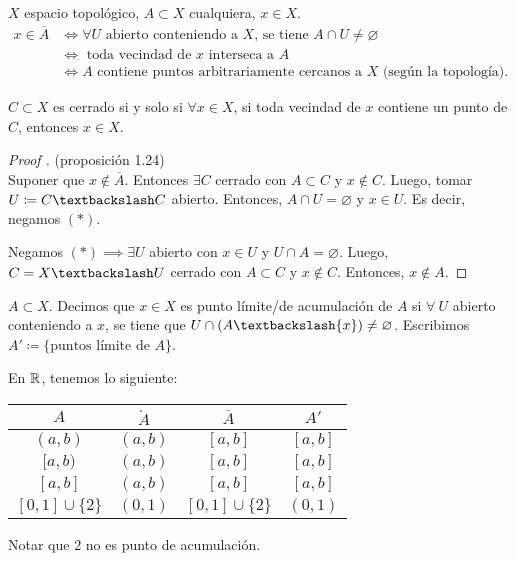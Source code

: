\begin{prop}
	$X$ espacio topológico, $A \subset X$ cualquiera, $x \in X$.
	\begin{align*}
		x \in \overline{A} & \iff \forall U \text{ abierto conteniendo a } X \text{, se tiene } A \cap U \neq \varnothing \tag*{($*$)} \\
		& \iff \text{ toda vecindad de } x \text{ interseca a } A \\
		& \iff A \text{ contiene puntos arbitrariamente cercanos a } X \text{ (según la topología)}
	.\end{align*}
\end{prop}

\begin{corollary}
	$C \subset X$ es cerrado si y solo si $\forall x \in X$, si toda vecindad de $x$ contiene un punto de $C$, entonces $x \in X$.
\end{corollary}

\begin{proof}[Proof ] (proposición 1.24) \\
	\Ifstep Suponer que $x \not\in \overline{A}$. Entonces $\exists C$ cerrado con $A \subset C$ y $x \not\in C$. Luego, tomar $U \coloneq C \textbackslash C$ abierto. Entonces, $A \cap U = \varnothing$ y $x \in U$. Es decir, negamos $(*)$.

	\noindent \Onlyifstep Negamos $(*) \implies \exists U$ abierto con $x \in U$ y $U \cap A = \varnothing$. Luego, $C = X \textbackslash U$ cerrado con $A \subset C$ y $x \not\in C$. Entonces, $x \not\in A$.
\end{proof}

\begin{definition}
	$A \subset X$. Decimos que $x \in X$ es punto límite/de acumulación de $A$ si $\forall \ U$ abierto conteniendo a $x$, se tiene que $U \cap ( A \textbackslash \{ x \} ) \neq \varnothing$. Escribimos $A' \coloneq \{ \text{puntos límite de } A \}$.
\end{definition}

\begin{eg}
	En $\mathbb{R}$, tenemos lo siguiente:
	\begin{center}
	\begin{tabular}{ | c | c | c | c | }
		\hline
		$A$ & $\mathring{A}$ & $\overline{A}$ & $A'$ \\
		\hline
		$(a,b)$ & $(a,b)$ & $[a,b]$ & $[a,b]$ \\
		$[a,b)$ & $(a,b)$ & $[a,b]$ & $[a,b]$ \\
		$[a,b]$ & $(a,b)$ & $[a,b]$ & $[a,b]$ \\
		$[0,1] \cup \{2\}$ & $(0,1)$ & $[0,1] \cup \{2\}$ & $(0,1)$ \\
		\hline
	\end{tabular}
	\end{center}
	\noindent Notar que $2$ no es punto de acumulación.
\end{eg}

